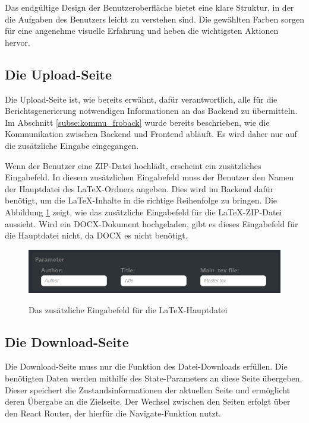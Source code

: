 Das endgültige Design der Benutzeroberfläche bietet eine klare Struktur, in der die Aufgaben des Benutzers leicht zu verstehen sind. Die gewählten Farben sorgen für eine angenehme visuelle Erfahrung und heben die wichtigsten Aktionen hervor.

\subsection{Die Upload-Seite}
Die Upload-Seite ist, wie bereits erwähnt, dafür verantwortlich, alle für die Berichtsgenerierung notwendigen Informationen an das Backend zu übermitteln. Im Abschnitt \ref{subse:kommu_froback} wurde bereits beschrieben, wie die Kommunikation zwischen Backend und Frontend abläuft. Es wird daher nur auf die zusätzliche Eingabe eingegangen.

Wenn der Benutzer eine ZIP-Datei hochlädt, erscheint ein zusätzliches Eingabefeld. In diesem zusätzlichen Eingabefeld muss der Benutzer den Namen der Hauptdatei des LaTeX-Ordners angeben. Dies wird im Backend dafür benötigt, um die LaTeX-Inhalte in die richtige Reihenfolge zu bringen. Die Abbildung \ref{fig:mainfile_frontend} zeigt, wie das zusätzliche Eingabefeld für die LaTeX-ZIP-Datei aussieht. Wird ein \ac{DOCX}-Dokument hochgeladen, gibt es dieses Eingabefeld für die Hauptdatei nicht, da \ac{DOCX} es nicht benötigt.

\begin{figure}[H]
\centering
\includegraphics[width=0.8\linewidth]{Images/mainfile_frontend.png}\\
\caption{Das zusätzliche Eingabefeld für die LaTeX-Hauptdatei}
\label{fig:mainfile_frontend}
\end{figure}

\subsection{Die Download-Seite}

Die Download-Seite muss nur die Funktion des Datei-Downloads erfüllen. Die benötigten Daten werden mithilfe des State-Parameters an diese Seite übergeben. Dieser speichert die Zustandsinformationen der aktuellen Seite und ermöglicht deren Übergabe an die Zielseite. Der Wechsel zwischen den Seiten erfolgt über den React Router, der hierfür die Navigate-Funktion nutzt.

